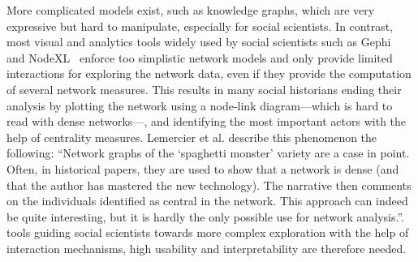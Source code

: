 More complicated models exist, such as knowledge graphs\cite{opitzInductionLargeScaleKnowledge2018}, which are very expressive but hard to manipulate, especially for social scientists.
In contrast, most visual and analytics tools widely used by social scientists such as Gephi~\cite{Gephi} and NodeXL~\cite{NodeXL} enforce too simplistic network models and only provide limited interactions for exploring the network data, even if they provide the computation of several network measures.
This results in many social historians ending their analysis by plotting the network using a node-link diagram---which is hard to read with dense networks---, and identifying the most important actors with the help of centrality measures\cite{lemercierQuantitativeMethodsHumanities2019}.
Lemercier et al. describe this phenomenon the following: ``Network graphs of the `spaghetti monster' variety are a case in point. Often, in historical papers, they are used to show that a network is dense (and that the author has mastered the new technology). The narrative then comments on the individuals identified as central in the network. This approach can indeed be quite interesting, but it is hardly the only possible use for network analysis.\cite{lemercierQuantitativeMethodsHumanities2019}''.
\va tools guiding social scientists towards more complex exploration with the help of interaction mechanisms, high usability and interpretability are therefore needed.

